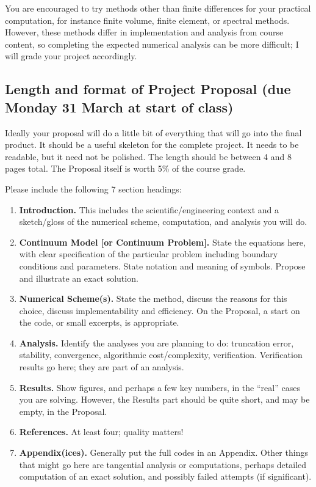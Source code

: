 \documentclass[11pt]{amsart}
\begin{document}
You are encouraged to try methods other than finite differences for your practical computation, for instance finite volume, finite element, or spectral methods.  However, these methods differ in implementation and analysis from course content, so completing the expected numerical analysis can be more difficult; I will grade your project accordingly.

\subsection*{Length and format of Project Proposal (due Monday 31 March at start of class)}  Ideally your proposal will do a little bit of everything that will go into the final product.  It should be a useful skeleton for the complete project.  It needs to be readable, but it need not be polished.  The length should be between 4 and 8 pages total.  The Proposal itself is worth 5\% of the course grade.

Please include the following 7 section headings:
\renewcommand{\labelenumi}{\arabic{enumi}.}
\begin{enumerate}
\item \textbf{Introduction.}  This includes the scientific/engineering context and a sketch/gloss of the numerical scheme, computation, and analysis you will do.
\item \textbf{Continuum Model [or Continuum Problem].}  State the equations here, with clear specification of the particular problem including boundary conditions and parameters.  State notation and meaning of symbols.  Propose and illustrate an exact solution.
\item \textbf{Numerical Scheme(s).}  State the method, discuss the reasons for this choice, discuss implementability and efficiency.  On the Proposal, a start on the code, or small excerpts, is appropriate.
\item \textbf{Analysis.}  Identify the analyses you are planning to do: truncation error, stability, convergence, algorithmic cost/complexity, verification.  Verification results go here; they are part of an analysis.
\item \textbf{Results.}  Show figures, and perhaps a few key numbers, in the ``real'' cases you are solving.  However, the Results part should be quite short, and may be empty, in the Proposal.
\item \textbf{References.}  At least four; quality matters!
\item \textbf{Appendix(ices).}  Generally put the full codes in an Appendix.  Other things that might go here are tangential analysis or computations, perhaps detailed computation of an exact solution, and possibly failed attempts (if significant).
\end{enumerate}
\end{document}
